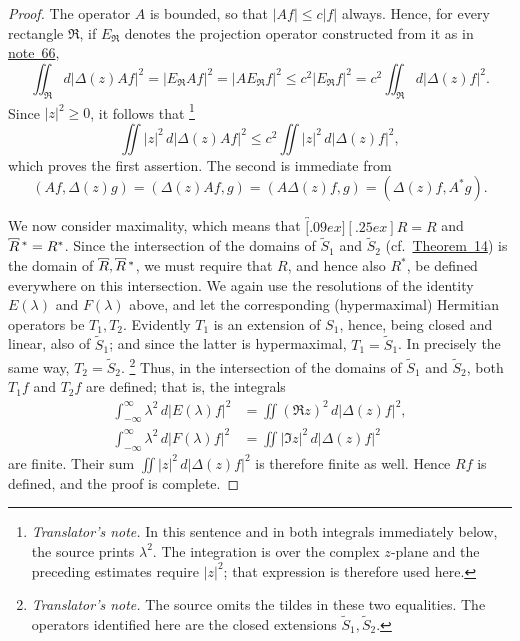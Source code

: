 \documentclass[
  paper=b5,
  twoside=true,
  fontsize=13pt,
  headings=normal,
  bookmarkpackage=false
]{scrartcl}
\theoremstyle{definition}
\newcommand{\NoteRef}[1]{\hyperref[fn:#1]{note~#1}}
\newcommand{\TheoremRef}[1]{\hyperref[thm:#1]{Theorem~#1}}
\newcommand{\MaximalExtension}[1]{\overbracket[.09ex][.25ex]{#1}}
\newcommand{\AdjointMaximalExtension}[1]{\MaximalExtension{#1}\vphantom{#1}^{*}}
\newcounter{translatornote}
\newcounter{savedfootnote}
\newcommand{\TranslatorNote}[1]{%
  \stepcounter{translatornote}%
  \setcounter{savedfootnote}{\value{footnote}}%
  \begingroup
    \renewcommand{\thefootnote}{T\arabic{translatornote}}%
    \footnote{\textit{Translator's note.} #1}%
  \endgroup
  \setcounter{footnote}{\value{savedfootnote}}}
\begin{document}
\begin{proof}
The operator \(A\) is bounded, so that \(\lvert Af\rvert\leq c\lvert
f\rvert\) always.  Hence, for every rectangle \(\mathfrak R\), if
\(E_{\mathfrak R}\) denotes the projection operator constructed from it
as in \NoteRef{66},
\[
  \iint_{\mathfrak R}d\lvert\Delta(z)Af\rvert^{2}
  =
  \lvert E_{\mathfrak R}Af\rvert^{2}
  =
  \lvert AE_{\mathfrak R}f\rvert^{2}
  \leq
  c^{2}\lvert E_{\mathfrak R}f\rvert^{2}
  =
  c^{2}\iint_{\mathfrak R}d\lvert\Delta(z)f\rvert^{2}.
\]
Since \(\lvert z\rvert^{2}\geq0\), it follows
that\TranslatorNote{In this sentence and in both integrals immediately below,
the source prints \(\lambda^2\).  The integration is over the complex
\(z\)-plane and the preceding estimates require \(\lvert z\rvert^2\);
that expression is therefore used here.}
\[
  \iint\lvert z\rvert^{2}\,d\lvert\Delta(z)Af\rvert^{2}
  \leq
  c^{2}\iint\lvert z\rvert^{2}\,d\lvert\Delta(z)f\rvert^{2},
\]
which proves the first assertion.  The second is immediate from
\[
  (Af,\Delta(z)g)
  =
  (\Delta(z)Af,g)
  =
  (A\Delta(z)f,g)
  =
  (\Delta(z)f,A^{*}g).
\]

We now consider maximality, which means that
\(\MaximalExtension{R}=R\) and \(\AdjointMaximalExtension{R}=R^{*}\).  Since the intersection of the domains of \(\widetilde S_{1}\) and
\(\widetilde S_{2}\) (cf.\ \TheoremRef{14}) is the domain of
\(\MaximalExtension{R},\AdjointMaximalExtension{R}\), we must require that \(R\), and hence
also \(R^{*}\), be defined everywhere on this intersection.  We again use
the resolutions of the identity \(E(\lambda)\) and \(F(\lambda)\) above,
and let the corresponding (hypermaximal) Hermitian operators be
\(T_{1},T_{2}\).  Evidently \(T_{1}\) is an extension of \(S_{1}\), hence,
being closed and linear, also of \(\widetilde S_{1}\); and since the latter
is hypermaximal, \(T_{1}=\widetilde S_{1}\).  In precisely the same way,
\(T_{2}=\widetilde S_{2}\).\TranslatorNote{The source omits the tildes in these
two equalities. The operators identified here are the closed extensions
\(\widetilde S_{1},\widetilde S_{2}\).}  Thus, in the intersection of the domains of
\(\widetilde S_{1}\) and \(\widetilde S_{2}\), both \(T_{1}f\) and
\(T_{2}f\) are defined; that is, the integrals
\begin{align*}
  \int_{-\infty}^{\infty}\lambda^{2}\,
     d\lvert E(\lambda)f\rvert^{2}
  &=
  \iint(\Re z)^{2}\,d\lvert\Delta(z)f\rvert^{2},\\
  \int_{-\infty}^{\infty}\lambda^{2}\,
     d\lvert F(\lambda)f\rvert^{2}
  &=
  \iint\lvert\Im z\rvert^{2}\,d\lvert\Delta(z)f\rvert^{2}
\end{align*}
are finite.  Their sum
\(\iint\lvert z\rvert^{2}\,d\lvert\Delta(z)f\rvert^{2}\) is therefore
finite as well.  Hence \(Rf\) is defined, and the proof is complete.
\end{proof}
\end{document}
